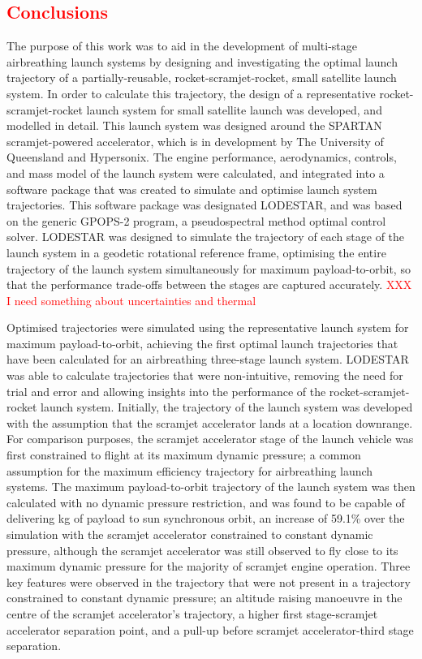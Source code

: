 
\cleardoublepage
\textcolor{red}{
\chapter{Conclusions}
}

The purpose of this work was to aid in the development of multi-stage airbreathing launch systems by designing and investigating the optimal launch trajectory of a partially-reusable, rocket-scramjet-rocket, small satellite launch system. 
In order to calculate this trajectory, the design of a representative rocket-scramjet-rocket launch system for small satellite launch was developed, and modelled in detail. This launch system was designed around the SPARTAN scramjet-powered accelerator, which is in development by The University of Queensland and Hypersonix. The engine performance, aerodynamics, controls, and mass model of the launch system were calculated, and integrated into a software package that was created to simulate and optimise launch system trajectories. This software package was designated LODESTAR, and was based on the generic GPOPS-2 program, a pseudospectral method optimal control solver. LODESTAR was designed to simulate the trajectory of each stage of the launch system in a geodetic rotational reference frame, optimising the entire trajectory of the launch system simultaneously for maximum payload-to-orbit, so that the performance trade-offs between the stages are captured accurately.
\textcolor{red}{XXX I need something about uncertainties and thermal}

Optimised trajectories were simulated using the representative launch system for maximum payload-to-orbit, achieving the first optimal launch trajectories that have been calculated for an airbreathing three-stage launch system. LODESTAR was able to calculate trajectories that were non-intuitive, removing the need for trial and error and allowing insights into the performance of the rocket-scramjet-rocket launch system. 
Initially, the trajectory of the launch system was developed with the assumption that the scramjet accelerator lands at a location downrange.
For comparison purposes, the scramjet accelerator stage of the launch vehicle was first constrained to flight at its maximum dynamic pressure;  a common assumption for the maximum efficiency trajectory for airbreathing launch systems.
The maximum payload-to-orbit trajectory of the launch system was then calculated with no dynamic pressure restriction, and was found to be capable of delivering \PayloadToOrbitStandardNoReturn kg of payload to sun synchronous orbit, an increase of 59.1\% over the simulation with the scramjet accelerator constrained to constant dynamic pressure, although the scramjet accelerator was still observed to fly close to its maximum dynamic pressure for the majority of scramjet engine operation. 
Three key features were observed in the trajectory that were not present in a trajectory constrained to constant dynamic pressure; an altitude raising manoeuvre in the centre of the scramjet accelerator's trajectory, a higher first stage-scramjet accelerator separation point, and a pull-up before scramjet accelerator-third stage separation.


